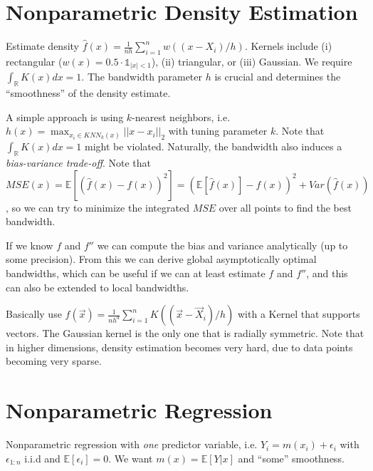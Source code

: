 \section{Nonparametric Density Estimation}\label{sec:nonparametric_density_estimation}
\begin{sectionbox}
  Estimate density $\hat f(x) = \frac{1}{nh}\sum_{i=1}^n w((x-X_i)/h)$.
  Kernels include (i) rectangular ($w(x) = 0.5\cdot\mathds{1}_{|x|<1}$), (ii) triangular, or (iii) Gaussian.
  We require $\int_\mathbb{R}K(x)dx = 1$.
  The bandwidth parameter $h$ is crucial and determines the ``smoothness'' of the density estimate.
\end{sectionbox}
\begin{sectionbox}\nospacing{}
  A simple approach is using $k$-nearest neighbors, i.e. $h(x)=\max_{x_i \in \mathit{KNN}_k(x)} ||x-x_i||_2$ with tuning parameter $k$.
  Note that $\int_\mathbb{R} K(x)dx = 1$ might be violated.
  Naturally, the bandwidth also induces a \emph{bias-variance trade-off}.
  Note that
  \(
    MSE(x) = \mathbb{E}\left[\left(\hat f(x)-f(x)\right)^2\right]=\left(\mathbb{E}[\hat f(x)] - f(x)\right)^2 + Var(\hat f(x))
  \), so we can try to minimize the integrated $MSE$ over all points to find the best bandwidth.

  If we know $f$ and $f''$ we can compute the bias and variance analytically (up to some precision).
  From this we can derive global asymptotically optimal bandwidths, which can be useful if we can at least estimate $f$ and $f''$, and this can also be extended to local bandwidths.
\end{sectionbox}
\begin{sectionbox}\nospacing{}
  Basically use $\hat f(\vec{x}) = \frac{1}{nh^d}\sum_{i=1}^nK((\vec{x}-\vec{X}_i)/h)$ with a Kernel that supports vectors.
  The Gaussian kernel is the only one that is radially symmetric.
  Note that in higher dimensions, density estimation becomes very hard, due to data points becoming very sparse.
\end{sectionbox}


\section{Nonparametric Regression}\label{sec:nonparametric_regression}
Nonparametric regression with \emph{one} predictor variable, i.e. $Y_{i} = m(x_{i}) + \epsilon_{i}$ with $\epsilon_{1:n}$ i.i.d and $\mathbb{E}[\epsilon_{i}] = 0$. We want $m(x) = \mathbb{E}[Y|x]$ and ``some'' smoothness.

